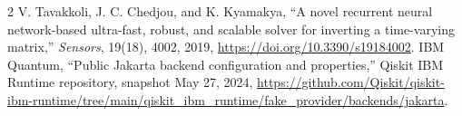 \documentclass[10pt]{article}
\begin{document}
\begin{thebibliography}{2}
 V. Tavakkoli, J. C. Chedjou, and K. Kyamakya,
``A novel recurrent neural network-based ultra-fast, robust, and scalable solver
for inverting a time-varying matrix,'' \emph{Sensors}, 19(18), 4002, 2019,
\url{https://doi.org/10.3390/s19184002}.
 IBM Quantum, ``Public Jakarta backend configuration and
properties,'' Qiskit IBM Runtime repository, snapshot May 27, 2024,
\url{https://github.com/Qiskit/qiskit-ibm-runtime/tree/main/qiskit_ibm_runtime/fake_provider/backends/jakarta}.
\end{thebibliography}
\end{document}
